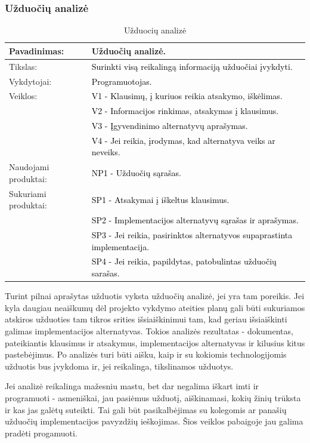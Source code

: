 \documentclass{VUMIFPSkursinis}
\begin{document}
	\subsubsection{Užduočių analizė}
	\begin{center}
		\begin{table}[ht]
			\caption{Užduocių analizė}
			\begin{tabular}{ | l | l | }
				\hline
				Pavadinimas:         & Užduočių analizė.								\\ \hline
				Tikslas:             & \textcolor{black}{Surinkti visą reikalingą informaciją užduočiai įvykdyti.}			\\ \hline
				Vykdytojai:          & \textcolor{black}{Programuotojas.}								\\ \hline
				Veiklos:             & \textcolor{black}{V1 - Klausimų, į kuriuos reikia atsakymo, iškėlimas.	}			\\
				                     & \textcolor{black}{V2 - Informacijos rinkimas, atsakymas į klausimus.}				\\
				                     & \textcolor{black}{V3 - Įgyvendinimo alternatyvų aprašymas.}					\\
				                     & \textcolor{black}{V4 - Jei reikia, įrodymas, kad alternatyva veiks ar neveiks.}			\\ \hline
				Naudojami produktai: & \textcolor{black}{NP1 - Užduočių sąrašas. }							\\ \hline
				Sukuriami produktai: & \textcolor{black}{SP1 - Atsakymai į iškeltus klausimus.}						\\
				                     & \textcolor{black}{SP2 - Implementacijos alternatyvų sąrašas ir aprašymas.	}		\\
				                     & \textcolor{black}{SP3 - Jei reikia, pasirinktos alternatyvos supaprastinta implementacija.}	\\
				                     & \textcolor{black}{SP4 - Jei reikia, papildytas, patobulintas užduočių sarašas.}			\\ \hline
			\end{tabular}
		\end{table}
	\end{center}
	Turint pilnai aprašytas užduotis vyksta užduočių analizė, jei yra tam poreikis.
	Jei kyla daugiau neaiškumų dėl projekto vykdymo ateities planų gali būti sukuriamos atskiros užduoties tam tikros srities išsiaiškinimui tam, kad geriau išsiaiškinti galimas implementacijos alternatyvas.
	Tokios analizės rezultatas - dokumentas, pateikiantis klausimus ir atsakymus, implementacijos alternatyvas ir kilusius kitus pastebėjimus.
	Po analizės turi būti aišku, kaip ir su kokiomis technologijomis užduotis bus įvykdoma ir, jei reikalinga, tikslinamos užduotys.
	\par
	Jei analizė reikalinga mažesniu mastu, bet dar negalima iškart imti ir programuoti - asmeniškai, jau pasiėmus užduotį, aiškinamasi, kokių žinių trūksta ir kas jas galėtų suteikti.
	Tai gali būt pasikalbėjimas su kolegomis ar panašių užduočių implementacijos pavyzdžių ieškojimas.
	Šios veiklos pabaigoje jau galima pradėti progamuoti.
\end{document}
